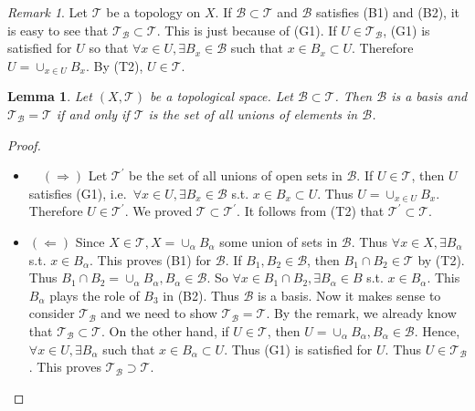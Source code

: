 \documentclass[
]{book}
\providecommand{\tightlist}{%
  \setlength{\itemsep}{0pt}\setlength{\parskip}{0pt}}
\newtheorem{lemma}{Lemma}[chapter]
\theoremstyle{definition}
\theoremstyle{definition}
\theoremstyle{definition}
\theoremstyle{definition}
\theoremstyle{remark}
\newtheorem*{remark}{Remark}
\begin{document}
\begin{remark}
Let \(\mathcal{T}\) be a topology on \(X\). If \(\mathcal{B} \subset \mathcal{T}\) and \(\mathcal{B}\) satisfies (B1) and (B2), it is easy to see that \(\mathcal{T}_{\mathcal{B}} \subset \mathcal{T}\). This is just because of (G1). If \(U \in \mathcal{T}_{\mathcal{B}}\), (G1) is satisfied for \(U\) so that \(\forall x \in U, \exists B_{x} \in \mathcal{B}\) such that \(x \in B_{x} \subset U\). Therefore \(U=\cup_{x \in U} B_{x}\). By (T2), \(U \in \mathcal{T}\).
\end{remark}

\begin{lemma}
\protect\hypertarget{lem:lemmaTequalsTB}{}\label{lem:lemmaTequalsTB}Let \((X, \mathcal{T})\) be a topological space. Let \(\mathcal{B} \subset \mathcal{T}\). Then \(\mathcal{B}\) is a basis and \(\mathcal{T}_{\mathcal{B}}=\mathcal{T}\) if and only if \(\mathcal{T}\) is the set of all unions of elements in \(\mathcal{B}\).
\end{lemma}

\begin{proof}
\leavevmode

\begin{itemize}
\tightlist
\item
  \(\quad(\Rightarrow)\) Let \(\mathcal{T}^{\prime}\) be the set of all unions of open sets in \(\mathcal{B}\). If \(U \in \mathcal{T}\), then \(U\) satisfies (G1), i.e.~\(\forall x \in U, \exists B_{x} \in \mathcal{B}\) s.t. \(x \in B_{x} \subset U\). Thus \(U=\cup_{x \in U} B_{x}\). Therefore \(U \in \mathcal{T}^{\prime}\). We proved \(\mathcal{T} \subset \mathcal{T}^{\prime}\). It follows from (T2) that \(\mathcal{T}^{\prime} \subset \mathcal{T}\).
\item
  \((\Leftarrow)\) Since \(X \in \mathcal{T}, X=\cup_{\alpha} B_{\alpha}\) some union of sets in \(\mathcal{B}\). Thus \(\forall x \in X, \exists B_{\alpha}\) s.t. \(x \in B_{\alpha}\). This proves (B1) for \(\mathcal{B}\). If \(B_{1}, B_{2} \in \mathcal{B}\), then \(B_{1} \cap B_{2} \in \mathcal{T}\) by (T2). Thus \(B_{1} \cap B_{2}=\cup_{\alpha} B_{\alpha}, B_{\alpha} \in \mathcal{B}\). So \(\forall x \in B_{1} \cap B_{2}, \exists B_{\alpha} \in B\) s.t. \(x \in B_{\alpha}\). This \(B_{\alpha}\) plays the role of \(B_{3}\) in (B2). Thus \(\mathcal{B}\) is a basis. Now it makes sense to consider \(\mathcal{T}_{\mathcal{B}}\) and we need to show \(\mathcal{T}_{\mathcal{B}}=\mathcal{T}\). By the remark, we already know that \(\mathcal{T}_{\mathcal{B}} \subset \mathcal{T}\). On the other hand, if \(U \in \mathcal{T}\), then \(U=\cup_{\alpha} B_{\alpha}, B_{\alpha} \in \mathcal{B}\). Hence, \(\forall x \in U, \exists B_{\alpha}\) such that \(x \in B_{\alpha} \subset U\). Thus (G1) is satisfied for \(U\). Thus \(U \in \mathcal{T}_{\mathcal{B}}\). This proves \(\mathcal{T}_{\mathcal{B}} \supset \mathcal{T}\).
\end{itemize}

\end{proof}
\end{document}
